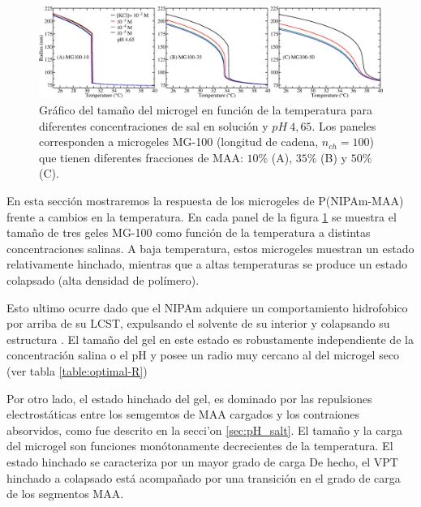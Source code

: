 \begin{figure}[!htb]
	\centering
	\includegraphics[width=1\linewidth]{Figures/graph-gel/R-T.png}
	\caption{Gr\'afico del tama\~no del microgel en funci\'on de la temperatura para diferentes concentraciones de sal en soluci\'on y $pH~4,65$.
		Los paneles corresponden a microgeles MG-100 (longitud de cadena, $n_{ch}=100$) que tienen diferentes fracciones de MAA: $10\%$ (A), $35\%$ (B) y $50\%$ (C).}
	\label{fig:R-T}
\end{figure}


En esta secci\'on mostraremos la respuesta de los microgeles de P(NIPAm-MAA) frente a cambios en la temperatura.
En cada panel de la figura \ref{fig:R-T} se muestra el tama\~no de tres geles MG-100 como funci\'on de la temperatura a distintas concentraciones salinas.
A baja temperatura, estos microgeles muestran un estado relativamente hinchado, mientras que a altas temperaturas se produce un estado colapsado (alta densidad de polímero).


Esto ultimo ocurre dado que el NIPAm adquiere un comportamiento hidrofobico por arriba de su LCST, expulsando el solvente de su interior y colapsando su estructura .
El tama\~no del gel en este estado es robustamente independiente de la concentraci\'on salina o el pH y posee un radio muy cercano al del microgel seco (ver tabla \ref{table:optimal-R})



Por otro lado, el estado hinchado del gel, es dominado por las repulsiones electrost\'aticas entre los semgemtos de MAA cargados y los contraiones absorvidos, como fue descrito en la secci'on \ref{sec:pH_salt}.
El tama\~no y la carga del microgel son funciones mon\'otonamente decrecientes de
la temperatura.
El estado hinchado se caracteriza por un mayor grado de carga %
De hecho, el VPT hinchado a colapsado est\'a acompa\~nado por una transici\'on en el grado de carga de los segmentos MAA.


